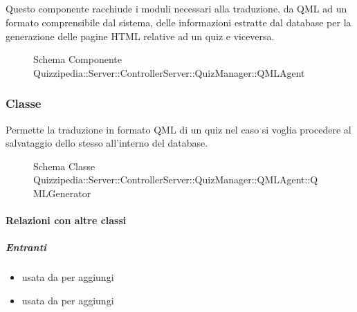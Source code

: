 \subsection{}
Questo componente racchiude i moduli necessari alla traduzione, da QML ad un formato comprensibile dal sistema, delle informazioni estratte dal database per la generazione delle pagine HTML relative ad un quiz e viceversa.
\begin{figure}[H]
\centering
\noindent{}
\caption[Schema Componente Quizzipedia::Server::ControllerServer::QuizManager::QMLAgent]{Schema Componente Quizzipedia::Server::ControllerServer::QuizManager::QMLAgent}
\end{figure}
\subsubsection{Classe }
Permette la traduzione in formato QML di un quiz nel caso si voglia procedere al salvataggio dello stesso all'interno del database.
\begin{figure}[H]
\centering
\noindent{}
\caption[Schema Classe QMLGenerator]{Schema Classe Quizzipedia::Server::ControllerServer::QuizManager::QMLAgent::QMLGenerator}
\end{figure}
\paragraph{Relazioni con altre classi}
\subparagraph{Entranti}
\begin{itemize}
\item usata da  per aggiungi
\item usata da  per aggiungi
\end{itemize}
